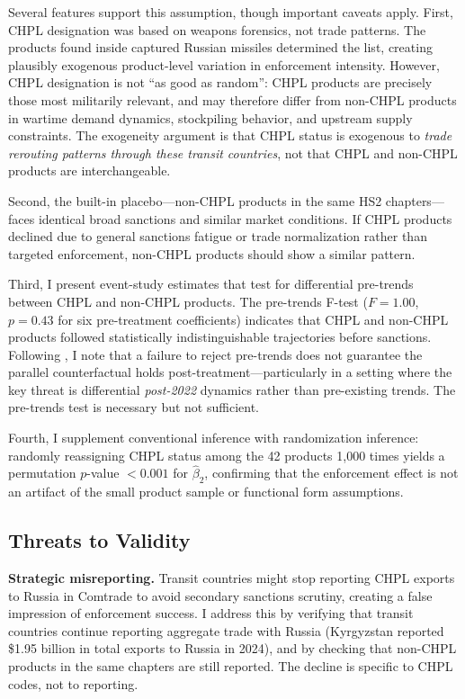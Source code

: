 \documentclass[12pt]{article}
\begin{document}
Several features support this assumption, though important caveats apply. First, CHPL designation was based on weapons forensics, not trade patterns. The products found inside captured Russian missiles determined the list, creating plausibly exogenous product-level variation in enforcement intensity. However, CHPL designation is not ``as good as random'': CHPL products are precisely those most militarily relevant, and may therefore differ from non-CHPL products in wartime demand dynamics, stockpiling behavior, and upstream supply constraints. The exogeneity argument is that CHPL status is exogenous to \textit{trade rerouting patterns through these transit countries}, not that CHPL and non-CHPL products are interchangeable.

Second, the built-in placebo---non-CHPL products in the same HS2 chapters---faces identical broad sanctions and similar market conditions. If CHPL products declined due to general sanctions fatigue or trade normalization rather than targeted enforcement, non-CHPL products should show a similar pattern.

Third, I present event-study estimates that test for differential pre-trends between CHPL and non-CHPL products. The pre-trends F-test ($F = 1.00$, $p = 0.43$ for six pre-treatment coefficients) indicates that CHPL and non-CHPL products followed statistically indistinguishable trajectories before sanctions. Following \citet{roth2022pretest}, I note that a failure to reject pre-trends does not guarantee the parallel counterfactual holds post-treatment---particularly in a setting where the key threat is differential \textit{post-2022} dynamics rather than pre-existing trends. The pre-trends test is necessary but not sufficient.

Fourth, I supplement conventional inference with randomization inference: randomly reassigning CHPL status among the 42 products 1,000 times yields a permutation $p$-value $< 0.001$ for $\hat{\beta}_2$, confirming that the enforcement effect is not an artifact of the small product sample or functional form assumptions.

\subsection{Threats to Validity}

\textbf{Strategic misreporting.} Transit countries might stop reporting CHPL exports to Russia in Comtrade to avoid secondary sanctions scrutiny, creating a false impression of enforcement success. I address this by verifying that transit countries continue reporting aggregate trade with Russia (Kyrgyzstan reported \$1.95 billion in total exports to Russia in 2024), and by checking that non-CHPL products in the same chapters are still reported. The decline is specific to CHPL codes, not to reporting.
\end{document}
